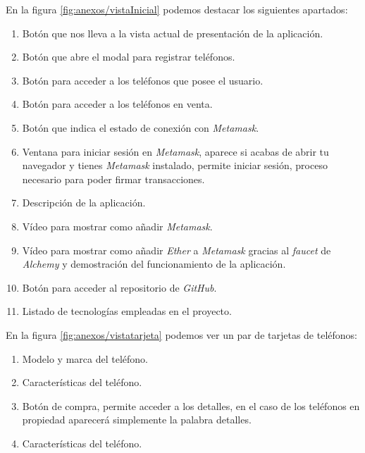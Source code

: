 
En la figura \ref{fig:anexos/vistaInicial} podemos destacar los siguientes apartados:
\begin{enumerate}
    \item Botón que nos lleva a la vista actual de presentación de la aplicación.
    \item Botón que abre el modal para registrar teléfonos.
    \item Botón para acceder a los teléfonos que posee el usuario.
    \item Botón para acceder a los teléfonos en venta.
    \item Botón que indica el estado de conexión con \textit{Metamask}.
    \item Ventana para iniciar sesión en \textit{Metamask}, aparece si acabas de abrir tu navegador y tienes \textit{Metamask} instalado, permite iniciar sesión, proceso necesario para poder firmar transacciones.
    \item Descripción de la aplicación.
    \item Vídeo para mostrar como añadir \textit{Metamask}.
    \item Vídeo para mostrar como añadir \textit{Ether} a \textit{Metamask} gracias al \textit{faucet} de \textit{Alchemy} y demostración del funcionamiento de la aplicación.
    \item Botón para acceder al repositorio de \textit{GitHub}.
    \item Listado de tecnologías empleadas en el proyecto.
\end{enumerate}


En la figura \ref{fig:anexos/vistatarjeta} podemos ver un par de tarjetas de teléfonos:
\begin{enumerate}
    \item Modelo y marca del teléfono.
    \item Características del teléfono.
    \item Botón de compra, permite acceder a los detalles, en el caso de los teléfonos en propiedad aparecerá simplemente la palabra detalles.
    \item Características del teléfono.
    
\end{enumerate}


